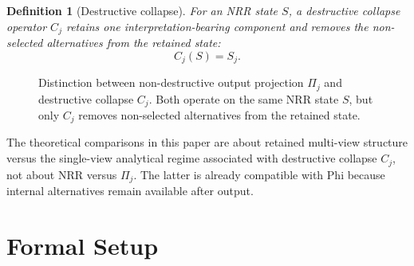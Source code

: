 \documentclass[11pt,a4paper]{article}
\newtheorem{definition}{Definition}
\begin{document}
\begin{definition}[Destructive collapse]
For an NRR state $S$, a destructive collapse operator $C_j$ retains one interpretation-bearing component and removes the non-selected alternatives from the retained state:
\begin{equation}
C_j(S) = S_j.
\end{equation}
\end{definition}
\begin{figure}[t]
\centering
{}
\caption{Distinction between non-destructive output projection $\Pi_j$ and destructive collapse $C_j$. Both operate on the same NRR state $S$, but only $C_j$ removes non-selected alternatives from the retained state.}
\label{fig:projection_vs_collapse}
\end{figure}

The theoretical comparisons in this paper are about retained multi-view structure versus the single-view analytical regime associated with destructive collapse $C_j$, not about NRR versus $\Pi_j$. The latter is already compatible with Phi because internal alternatives remain available after output.

\section{Formal Setup}
\label{sec:setup}
\end{document}
